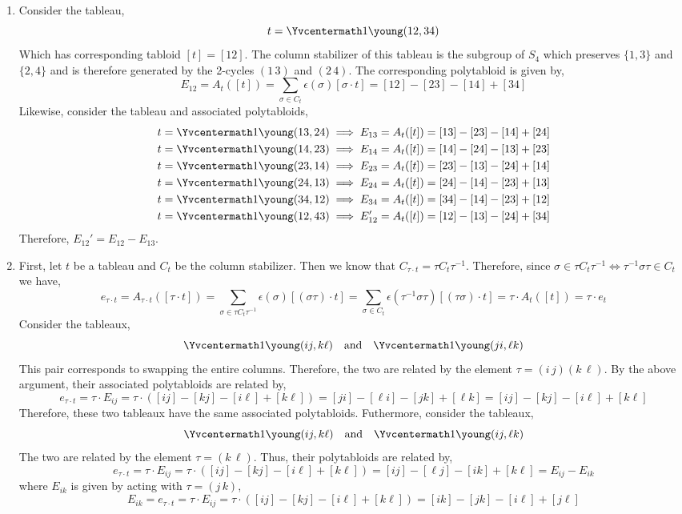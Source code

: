 \documentclass[12pt]{extarticle}
\begin{document}
\begin{enumerate}
\item Consider the tableau, \[
t = \Yvcentermath1\young(12,34)\]
Which has corresponding tabloid $[t] = [12]$. The column stabilizer of this tableau is the subgroup of $S_4$ which preserves $\{1, 3\}$ and $\{2, 4\}$ and is therefore generated by the 2-cycles $(1 \, 3)$ and $(2 \, 4)$. The corresponding polytabloid is given by,
\[ E_{12} = A_t([t]) = \sum_{\sigma \in C_t} \epsilon(\sigma) [\sigma \cdot t] = [12] - [23] - [14] + [34] \] 
Likewise, consider the tableau and associated polytabloids,
\begin{align*}
t & = \Yvcentermath1\young(13,24) \implies E_{13} = A_t([t]) = [13] - [23] - [14] + [24]
\\
t & = \Yvcentermath1\young(14,23) \implies E_{14} = A_t([t]) = [14] - [24] - [13] + [23]
\\
t & = \Yvcentermath1\young(23,14) \implies E_{23} = A_t([t]) = [23] - [13] - [24] + [14]
\\
t & = \Yvcentermath1\young(24,13) \implies E_{24} = A_t([t]) = [24] - [14] - [23] + [13]
\\
t & = \Yvcentermath1\young(34,12) \implies E_{34} = A_t([t]) = [34] - [14] - [23] + [12]
\\
t & = \Yvcentermath1\young(12,43) \implies E_{12}' = A_t([t]) = [12] - [13] - [24] + [34]
\end{align*}
Therefore, $E_{12}' = E_{12} - E_{13}$. 
\item 
First, let $t$ be a tableau and $C_t$ be the column stabilizer. Then we know that $C_{\tau \cdot t} = \tau C_{t} \tau^{-1}$. Therefore, since $\sigma \in \tau C_t \tau^{-1} \iff \tau^{-1} \sigma \tau \in C_t$ we have,
\[ e_{\tau \cdot t} = A_{\tau \cdot t}([\tau \cdot t]) = \sum_{\sigma \in \tau C_t \tau^{-1}} \epsilon(\sigma) [(\sigma \tau) \cdot t] = \sum_{\sigma \in C_t} \epsilon(\tau^{-1} \sigma \tau) [(\tau \sigma) \cdot t] = \tau \cdot A_t([t]) = \tau \cdot e_t \] Consider the tableaux,
\[
\Yvcentermath1\young(ij,k\ell) \quad \text{and} \quad \Yvcentermath1\young(ji,\ell k)
\]
This pair corresponds to swapping the entire columns. Therefore, the two are related by the element $\tau = (i \, j) (k \, \ell)$. By the above argument, their associated polytabloids are related by,
\[ e_{\tau \cdot t} = \tau \cdot E_{ij} = \tau \cdot \left( [ij] - [kj] - [i \ell] + [k \ell] \right) = [ji] - [\ell i] - [j k] + [\ell k] = [ij] - [kj] - [i \ell] + [k \ell]\]
Therefore, these two tableaux have the same associated polytabloids.
Futhermore, consider the tableaux,
\[
\Yvcentermath1\young(ij,k\ell) \quad \text{and} \quad \Yvcentermath1\young(ij,\ell k)
\]
The two are related by the element $\tau = (k \, \ell)$. Thus, their polytabloids are related by,
\[ e_{\tau \cdot t} = \tau \cdot E_{ij} = \tau \cdot \left( [ij] - [kj] - [i \ell] + [k \ell] \right) = [ij] - [\ell j] - [i k] + [k \ell] = E_{ij} - E_{i k} \]
where $E_{ik}$ is given by acting with $\tau = (j \, k)$,
\[ E_{ik} = e_{\tau \cdot t} = \tau \cdot E_{ij} = \tau \cdot \left( [ij] - [kj] - [i \ell] + [k \ell] \right) = [ik] - [jk] - [i \ell] + [j \ell] \] 


\end{enumerate}
\end{document}
